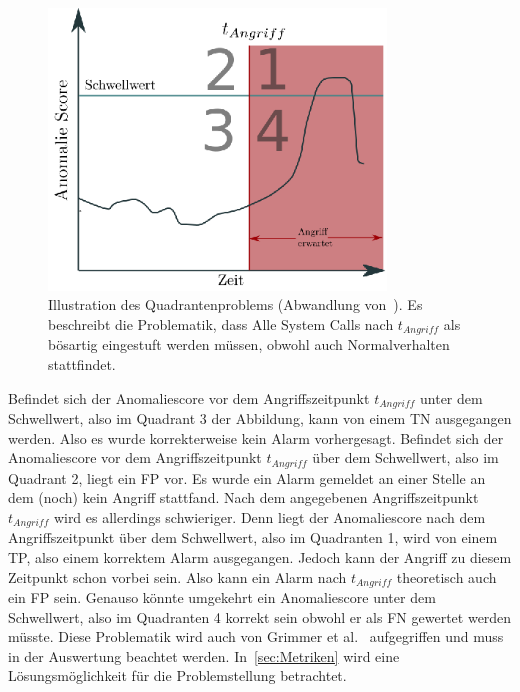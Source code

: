                     \begin{figure}[ht]
                        \centering
                        \includegraphics[width=0.8\textwidth]{images/q_problem.eps}
                        \caption{Illustration des Quadrantenproblems (Abwandlung von~\cite{IDSTHREADGRIMMER2021}).
                        Es beschreibt die Problematik, dass Alle System Calls nach $t_{Angriff}$ als bösartig eingestuft werden müssen, obwohl auch Normalverhalten stattfindet.}
                        \label{fig:quadrant}
                    \end{figure}

                    Befindet sich der Anomaliescore vor dem Angriffszeitpunkt $t_{Angriff}$ unter dem Schwellwert, also im Quadrant 3 der Abbildung, kann von einem \ac{TN} ausgegangen werden.
                    Also es wurde korrekterweise kein Alarm vorhergesagt.
                    Befindet sich der Anomaliescore vor dem Angriffszeitpunkt $t_{Angriff}$ über dem Schwellwert, also im Quadrant 2, liegt ein \ac{FP} vor.
                    Es wurde ein Alarm gemeldet an einer Stelle an dem (noch) kein Angriff stattfand.
                    Nach dem angegebenen Angriffszeitpunkt $t_{Angriff}$ wird es allerdings schwieriger.
                    Denn liegt der Anomaliescore nach dem Angriffszeitpunkt über dem Schwellwert, also im Quadranten 1, wird von einem \ac{TP}, also einem korrektem Alarm ausgegangen.
                    Jedoch kann der Angriff zu diesem Zeitpunkt schon vorbei sein.
                    Also kann ein Alarm nach $t_{Angriff}$ theoretisch auch ein \ac{FP} sein. 
                    Genauso könnte umgekehrt ein Anomaliescore unter dem Schwellwert, also im Quadranten 4 korrekt sein obwohl er als \ac{FN} gewertet werden müsste.
                    Diese Problematik wird auch von Grimmer et al.~\cite{IDSTHREADGRIMMER2021} aufgegriffen und muss in der Auswertung beachtet werden. 
                    In~\autoref{sec:Metriken} wird eine Lösungsmöglichkeit für die Problemstellung betrachtet.


